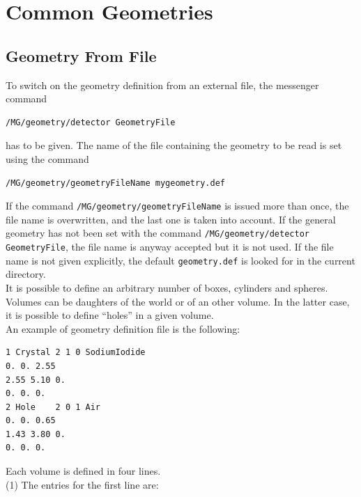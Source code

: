 \section{Common Geometries}

\subsection{Geometry From File}
To switch on the geometry definition from an external file, the messenger 
command 
\begin{lstlisting}
/MG/geometry/detector GeometryFile
\end{lstlisting}
has to be given. The name of the file containing the geometry to be read 
is set using the command 
\begin{lstlisting}
/MG/geometry/geometryFileName mygeometry.def
\end{lstlisting}
If the command \texttt{/MG/geometry/geometryFileName} is issued more than 
once, the file name is overwritten, and the last one is taken into account. 
If the general geometry has not been set with the command 
\texttt{/MG/geometry/detector GeometryFile}, the file name is anyway accepted 
but it is not used. If the file name is not given explicitly, the default 
\texttt{geometry.def} is looked for in the current directory. \\
It is possible to define an arbitrary 
number of boxes, cylinders and spheres. Volumes can be daughters of the 
world or of an other volume. In the latter case, it is possible to define 
``holes'' in a given volume. \\
An example of geometry definition file is the following: \\
\begin{lstlisting}
1 Crystal 2 1 0 SodiumIodide   
0. 0. 2.55 
2.55 5.10 0. 
0. 0. 0. 
2 Hole    2 0 1 Air             
0. 0. 0.65 
1.43 3.80 0.
0. 0. 0. 
\end{lstlisting}
Each volume is defined in four lines. \\
(1) The entries for the first line are:

